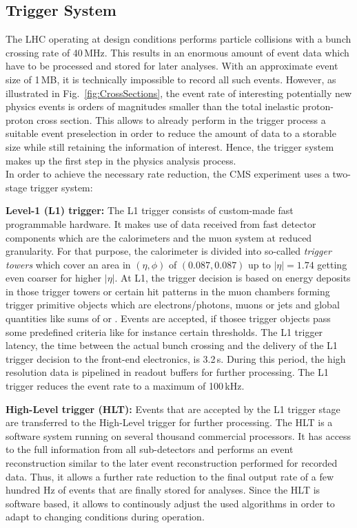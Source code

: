 \subsection{Trigger System}
\label{subsec:cms_trigger}
The LHC operating at design conditions performs particle collisions with a bunch crossing rate of 40\,MHz. This results in an enormous amount of event data which have to be processed and stored for later analyses. With an approximate event size of 1\,MB, it is technically impossible to record all such events. However, as illustrated in Fig.~\ref{fig:CrossSections}, the event rate of interesting potentially new physics events is orders of magnitudes smaller than the total inelastic proton-proton cross section. This allows to already perform in the trigger process a suitable event preselection in order to reduce the amount of data to a storable size while still retaining the information of interest. Hence, the trigger system makes up the first step in the physics analysis process.\\
In order to achieve the necessary rate reduction, the CMS experiment uses a two-stage trigger system:
\begin{description}
\item \textbf{Level-1 (L1) trigger:} The L1 trigger consists of custom-made fast programmable hardware. It makes use of data received from fast detector components which are the calorimeters and the muon system at reduced granularity. For that purpose, the calorimeter is divided into so-called \textit{trigger towers} which cover an area in $(\eta, \phi)$ of $(0.087, 0.087)$ up to $|\eta| = 1.74$ getting even coarser for higher $|\eta|$. At L1, the trigger decision is based on energy deposits in those trigger towers or certain hit patterns in the muon chambers forming trigger primitive objects which are electrons/photons, muons or jets and global quantities like sums of \et or \met. Events are accepted, if thosee trigger objects pass some predefined criteria like for instance certain \pt thresholds. The L1 trigger latency, \ie the time between the actual bunch crossing and the delivery of the L1 trigger decision to the front-end electronics, is 3.2\,\textmu s. During this period, the high resolution data is pipelined in readout buffers for further processing. The L1 trigger reduces the event rate to a maximum of 100\,kHz.
\item \textbf{High-Level trigger (HLT):} Events that are accepted by the L1 trigger stage are transferred to the High-Level trigger for further processing. The HLT is a software system running on several thousand commercial processors. It has access to the full information from all sub-detectors and performs an event reconstruction similar to the later event reconstruction performed for recorded data. Thus, it allows a further rate reduction to the final output rate of a few hundred Hz of events that are finally stored for analyses. Since the HLT is software based, it allows to continously adjust the used algorithms in order to adapt to changing conditions during operation.
\end{description}

